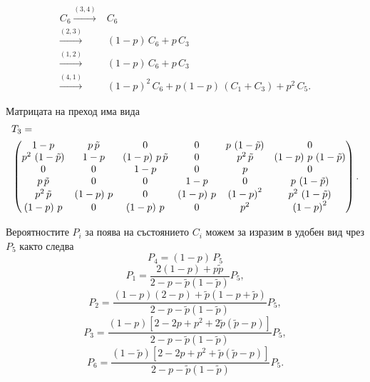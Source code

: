 \documentclass[a4paper,10pt]{article}
\begin{document}
%
\begin{equation}
\begin{split}
C_6 \xrightarrow{(3,4)}& C_6\\
    \xrightarrow{(2,3)}& (1-p)\,C_6 + p\,C_3\\
    \xrightarrow{(1,2)}& (1-p)\,C_6 + p\,C_3\\
    \xrightarrow{(4,1)}& (1-p)^2\,C_6 + p(1-p)\,(C_1+C_3) + p^2\,C_5.
\end{split}
\end{equation}

Матрицата на преход има вида
{\small
\begin{equation}
\begin{split}
&T_{3} = \\
&\begin{pmatrix}
 1-p & p\,\tilde{p} & 0 & 0 & p\,\left( 1-\tilde{p}\right)  & 0\cr
 {p}^{2}\,\left( 1-\tilde{p}\right)  & 1-p & \left( 1-p\right) \,p\,\tilde{p} & 0 & {p}^{2}\,\tilde{p} & \left( 1-p\right) \,p\,\left( 1-\tilde{p}\right) \cr
 0 & 0 & 1-p & 0 & p & 0\cr
 p\,\tilde{p} & 0 & 0 & 1-p & 0 & p\,\left( 1-\tilde{p}\right) \cr
 {p}^{2}\,\tilde{p} & \left( 1-p\right) \,p & 0 & \left( 1-p\right) \,p & {\left( 1-p\right) }^{2} & {p}^{2}\,\left( 1-\tilde{p}\right) \cr
 \left( 1-p\right) \,p & 0 & \left( 1-p\right) \,p & 0 & {p}^{2} & {\left( 1-p\right) }^{2}
\end{pmatrix}.
\end{split}
\end{equation}
}

Вероятностите $P_i$ за поява на състоянието $C_i$ можем за изразим в удобен вид чрез $P_5$
както следва
\begin{equation}
 P_4 = (1-p)\,P_5
\end{equation}
\begin{equation}
 P_1 = \frac{2(1-p) + p\tilde{p}}{2-p-\tilde{p}(1-\tilde{p})} P_5,
\end{equation}
\begin{equation}
 P_2 = \frac{(1-p)(2-p)+\tilde{p}(1-p+\tilde{p})}{2-p-\tilde{p}(1-\tilde{p})} P_5,
\end{equation}
\begin{equation}
 P_3 = \frac{(1-p)[2-2p+p^2+2\tilde{p}(\tilde{p}-p)]}{2-p-\tilde{p}(1-\tilde{p})} P_5,
\end{equation}
\begin{equation}
 P_6 = \frac{(1-\tilde{p})[2-2p+p^2+\tilde{p}(\tilde{p}-p)]}{2-p-\tilde{p}(1-\tilde{p})} P_5.
\end{equation}
%
%
%
%
\end{document}
